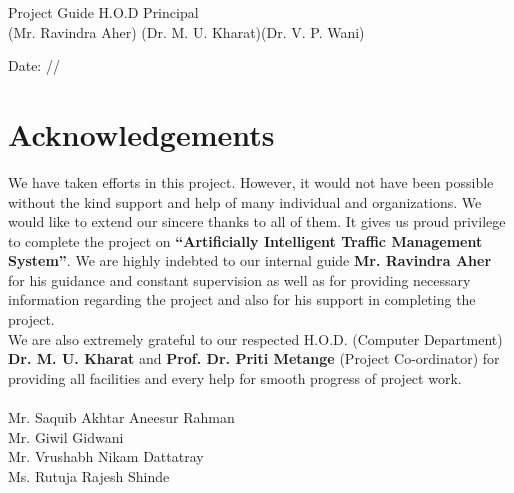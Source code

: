 \documentclass[openany,12pt]{report}
\begin{document}
	\hspace{0.1in} Project Guide  \hspace{1.5in}H.O.D \hspace{0.9in} Principal  \\
	\hspace{4.6in} (Mr. Ravindra Aher) \hspace{0.6in}(Dr. M. U. Kharat)\hspace{0.4in}(Dr. V. P. Wani)\\
	\vspace{0.2in}
	
	Date: \hspace{0.2 in}/\hspace{0.3 in}/   \\
	\newpage {}
	\chapter*{Acknowledgements}
	
	\hspace*{0.5 in}We have taken efforts in this project. However, it would not have been possible without the kind support and help of many individual and organizations. We would like to extend our sincere thanks to all of them. It gives us proud privilege to complete the project on \textbf{ ``Artificially Intelligent Traffic Management System''}. We are highly indebted to our internal guide \textbf{Mr. Ravindra Aher} for his guidance and constant supervision as well as for providing necessary information regarding the project and also for his support in completing the project.\\
	
	\hspace*{0.5 in}We are also extremely grateful to our respected H.O.D. (Computer Department) \textbf{Dr. M. U. Kharat} and \textbf{Prof. Dr. Priti Metange} (Project Co-ordinator) for providing all facilities and every help for smooth progress of project work.\\
	\\
	\hspace*{3.5 in}Mr. Saquib Akhtar Aneesur Rahman\\
	\hspace*{3.5 in}Mr. Giwil Gidwani \\
	\hspace*{3.5 in}Mr. Vrushabh Nikam Dattatray\\
	\hspace*{3.5 in}Ms. Rutuja Rajesh Shinde
	
\end{document}
